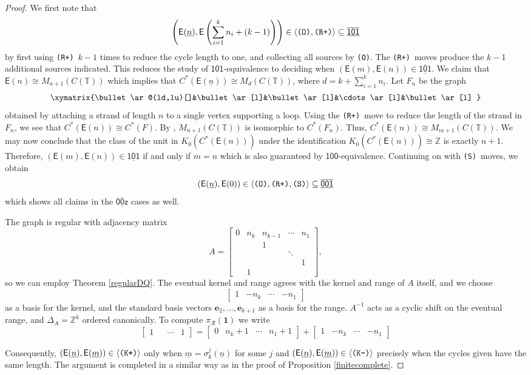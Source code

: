 \documentclass[12pt]{amsbook}%
\newcommand{\ee}{{\mathbf e}}
\theoremstyle{defin}
\theoremstyle{remark}
\numberwithin{equation}{chapter}
\numberwithin{theor}{section}
\newcommand{\nn}{\underline{n}}
\newcommand{\mm}{\underline{m}}
\newcommand{\TT}{\mathbb{T}}
\newcommand{\ZZ}{\mathbb{Z}}
\newcommand{\xyz}[1]{\mbox{$\mathsf{#1}$}}
\newcommand{\xyzrel}[1]{\mbox{$\overline{\underline{\mathsf{ #1}}}$}}
\newcommand{\OOO}{\mbox{\texttt{\textup{(O)}}}}
\newcommand{\RRRp}{\mbox{\texttt{\textup{(R+)}}}}
\newcommand{\KKKp}{\mbox{\texttt{\textup{(K+)}}}}
\newcommand{\KKKm}{\mbox{\texttt{\textup{(K-)}}}}
\newcommand{\SSS}{\mbox{\texttt{\textup{(S)}}}}
\newcommand{\GC}{{\mathsf E}}
\newcommand{\uu}{\mathbf{1}}
\newcommand{\pK}[1]{\pi_{\mathcal R}(#1)}
\begin{document}
  \begin{proof}
  We first note that
  \[
  \left(\GC(\nn),\GC\left(\sum_{i=1}^kn_i+(k-1)\right)\right)\in \langle \OOO,\RRRp\rangle\subseteq \xyzrel{101}
  \]
  by  first using \RRRp\ $k-1$ times to reduce the cycle length to one, and collecting all sources by \OOO. The \RRRp\ moves  produce the $k-1$ additional sources indicated.  This reduces the study of \xyz{101}-equivalence to deciding  when $(\GC(m),\GC(n))\in\xyzrel{101}$.  We claim that $\GC(n) \cong M_{n+1}(C(\TT))$ which implies that $C^*(\GC(\nn)) \cong M_d(C(\TT))$, where $d = k + \sum_{i=1}^k n_i$.  Let $F_n$ be the graph
  \[
  \xymatrix{\bullet\ar@(ld,lu)[]&\bullet\ar[l]&\bullet\ar[l]&\cdots\ar[l]&\bullet\ar[l]
  }
  \] 
    obtained by attaching a strand of length $n$ to a single vertex supporting a loop.  Using the \RRRp\ move to reduce the length of the strand in $F_n$, we see that $C^*(\GC(n)) \cong C^*(F)$.  By \cite[Proposition~9.3]{gamt:imega}, $M_{n+1}(C(\TT))$ is isomorphic to $C^*(F_n)$.  Thus, $C^*(\GC(n)) \cong M_{m+1}(C(\TT))$.  We may now conclude that the class of the unit in $K_0(C^*(\GC(n)))$ under the identification $K_0(C^*(\GC(n))) \cong \ZZ$ is exactly $n+1$.  Therefore, $(\GC(m),\GC(n))\in\xyzrel{101}$ if and only if $m=n$ which is also guaranteed by $\xyz{100}$-equivalence. Continuing on with \SSS\ moves, we obtain
 \[
(\GC(\nn),\GC(0))\in \langle \OOO,\RRRp,\SSS\rangle\subseteq \xyzrel{001}
  \]
  which shows all claims in the \xyzrel{00z} cases as well.
  
The graph is regular with adjacency matrix
\[
A=\left[\begin{array}{ccccc}
0&n_k&n_{k-1}&\cdots&n_{1}\\
&&1&&\\
&&&\ddots&\\
&&&&1\\
&1&&&
\end{array}\right],
\]
so we can employ Theorem \ref{regularDQ}. The eventual kernel and range agrees with the kernel and range of $A$ itself, and we choose
\[
\begin{bmatrix}1&-n_k&\cdots&-n_1\end{bmatrix}
\]
as a basis for the kernel, and the standard basis vectors $\ee_2,\dots,\ee_{k+1}$ as a basis for the range.  $A^{-1}$ acts as a cyclic shift on the eventual range, and $\Delta_A=\ZZ^k$ ordered canonically. To compute $\pK{\uu}$ we write
\[
\begin{bmatrix}1&&\cdots&1\end{bmatrix}=\begin{bmatrix}0&n_k+1&\cdots&n_1+1\end{bmatrix}+\begin{bmatrix}1&-n_k&\cdots&-n_1\end{bmatrix}
\]

 Consequently, $(\GC(\nn),\GC(\mm))\in \langle\KKKp\rangle$ only when $\mm=\sigma_k^j(\nn)$ for some $j$ and $(\GC(\nn),\GC(\mm))\in \langle\KKKm\rangle$ precisely when the cycles given have the same length.  The argument is completed in a similar way as in the proof of Proposition \ref{finitecomplete}.
 \end{proof}
 
\end{document}

